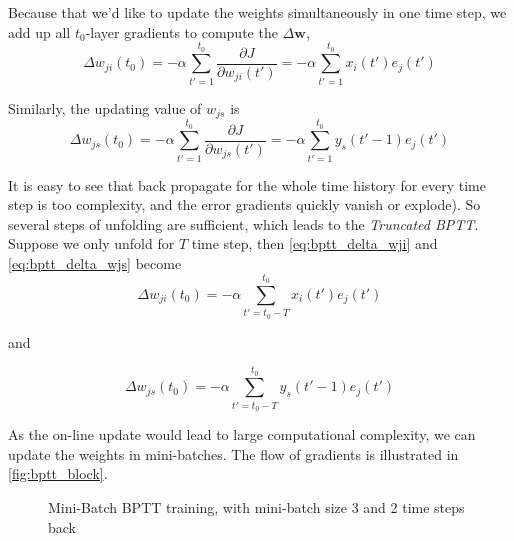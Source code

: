 \documentclass[12pt]{article}
\numberwithin{equation}{section}
\begin{document}
Because that we'd like to update the weights simultaneously in one time step, we add up all $t_0$-layer gradients to compute the $\Delta\bm{w}$,
\begin{equation}\label{eq:bptt_delta_wji}
   \Delta w_{ji}(t_0) = -\alpha\sum_{t'=1}^{t_0}\frac{\partial J}{\partial w_{ji}(t')} = -\alpha\sum_{t'=1}^{t_0}x_i(t')e_j(t')
\end{equation}

Similarly, the updating value of $w_{js}$ is 
\begin{equation}\label{eq:bptt_delta_wjs}
   \Delta w_{js}(t_0) = -\alpha\sum_{t'=1}^{t_0}\frac{\partial J}{\partial w_{js}(t')} = -\alpha\sum_{t'=1}^{t_0}y_s(t'-1)e_j(t')
\end{equation}

It is easy to see that back propagate for the whole time history for every time step is too complexity, and the error gradients quickly vanish or explode).
So several steps of unfolding are sufficient, which leads to the \emph{Truncated BPTT}. Suppose we only unfold for $T$ time step, 
then \eqref{eq:bptt_delta_wji} and \eqref{eq:bptt_delta_wjs} become
\begin{equation}
   \Delta w_{ji}(t_0) = -\alpha\sum_{t'=t_0-T}^{t_0}x_i(t')e_j(t')
\end{equation}

and

\begin{equation}
   \Delta w_{js}(t_0) =  -\alpha\sum_{t'=t_0-T}^{t_0}y_s(t'-1)e_j(t')
\end{equation}


As the on-line update would lead to large computational complexity, we can update the weights in mini-batches. 
The flow of gradients is illustrated in \autoref{fig:bptt_block}.

\begin{figure}[ht]
\begin{center}
  
  
  \caption{Mini-Batch BPTT training, with mini-batch size 3 and 2 time steps back}
  \label{fig:bptt_block}
\end{center}
\end{figure}




\end{document}
